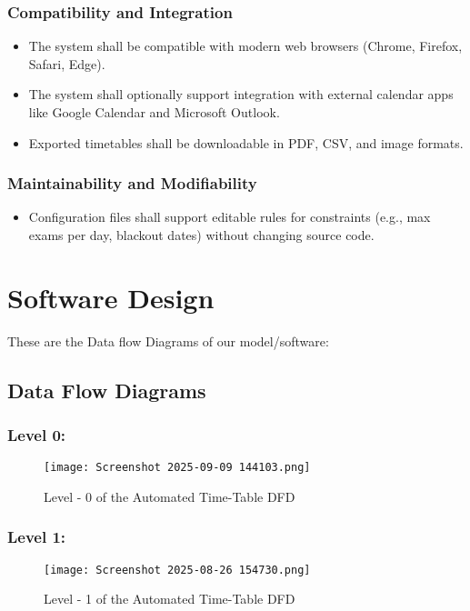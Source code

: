 \documentclass[a4paper,12pt]{article}
\begin{document}
\subsubsection{Compatibility and Integration}
\begin{itemize}
\item The system shall be compatible with modern web browsers (Chrome, Firefox, Safari, Edge).

\item The system shall optionally support integration with external calendar apps like Google Calendar and Microsoft Outlook.

\item Exported timetables shall be downloadable in PDF, CSV, and image formats.
\end{itemize}

\subsubsection{Maintainability and Modifiability}
\begin{itemize}

\item Configuration files shall support editable rules for constraints (e.g., max exams per day, blackout dates) without changing source code.
\end{itemize}





\section{Software Design}
These are the Data flow Diagrams of our model/software:
\subsection{Data Flow Diagrams}
\subsubsection{Level 0:}
\begin{figure}[H]
    \centering
    \texttt{[image: Screenshot 2025-09-09 144103.png]}
        \caption{Level - 0 of the Automated Time-Table DFD}
    \label{fig:placeholder}
\end{figure}
\subsubsection{Level 1:}
\begin{figure}[H]
        \centering
        \texttt{[image: Screenshot 2025-08-26 154730.png]}
        \caption{Level - 1 of the Automated Time-Table DFD}
        \label{fig:placeholder}
    \end{figure}
\end{document}
